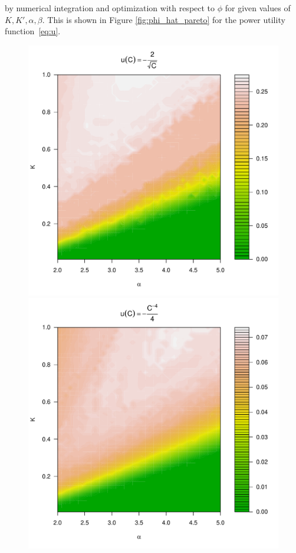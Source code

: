 \documentclass[11pt,a4]{amsart}
\newcommand{\fct}{function}
\newcommand{\1}{{\mathbf 1}}
\begin{document}
by numerical integration and optimization with respect to $\phi$ for given values of $K, K', \alpha, \beta$. 
This is shown in 
Figure \ref{fig:phi_hat_pareto} for the power utility \fct\ \eqref{eq:u}.
\begin{figure}
  \begin{minipage}{0.5\linewidth}
    \includegraphics[width=\textwidth]{phi_hat_pareto5e-1.pdf}    
  \end{minipage}\hfill
  \begin{minipage}{0.5\linewidth}
    \includegraphics[width=\textwidth]{phi_hat_pareto4.pdf}

\end{minipage}
\end{figure}
\end{document}
